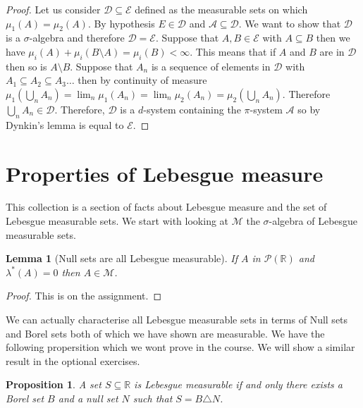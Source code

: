 \documentclass[
]{book}
\newtheorem{lemma}{Lemma}[chapter]
\newtheorem{proposition}{Proposition}[chapter]
\theoremstyle{definition}
\theoremstyle{definition}
\theoremstyle{definition}
\theoremstyle{definition}
\theoremstyle{remark}
\begin{document}
\begin{proof}
Let us consider \(\mathcal{D} \subseteq \mathcal{E}\) defined as the measurable sets on which \(\mu_1(A) = \mu_2(A)\). By hypothesis \(E \in \mathcal{D}\) and \(\mathcal{A} \subseteq \mathcal{D}\). We want to show that \(\mathcal{D}\) is a \(\sigma\)-algebra and therefore \(\mathcal{D} = \mathcal{E}\). Suppose that \(A, B \in \mathcal{E}\) with \(A \subseteq B\) then we have \(\mu_i(A) + \mu_i (B \setminus A) = \mu_i(B) < \infty.\) This means that if \(A\) and \(B\) are in \(\mathcal{D}\) then so is \(A \setminus B\). Suppose that \(A_n\) is a sequence of elements in \(\mathcal{D}\) with \(A_1 \subseteq A_2 \subseteq A_3 \dots\) then by continuity of measure \(\mu_1(\bigcup_n A_n) = \lim_n \mu_1(A_n) = \lim_n \mu_2(A_n) = \mu_2(\bigcup_n A_n)\). Therefore \(\bigcup_n A_n \in \mathcal{D}\). Therefore, \(\mathcal{D}\) is a \(d\)-system containing the \(\pi\)-system \(\mathcal{A}\) so by Dynkin's lemma is equal to \(\mathcal{E}\).
\end{proof}

\hypertarget{properties-of-lebesgue-measure}{%
\section{Properties of Lebesgue measure}\label{properties-of-lebesgue-measure}}

This collection is a section of facts about Lebesgue measure and the set of Lebesgue measurable sets. We start with looking at \(\mathscr{M}\) the \(\sigma\)-algebra of Lebesgue measurable sets.

\begin{lemma}[Null sets are all Lebesgue measurable]
If \(A\) in \(\mathscr{P}(\mathbb{R})\) and \(\lambda^*(A) =0\) then \(A \in \mathscr{M}\).
\end{lemma}

\begin{proof}
This is on the assignment.
\end{proof}

We can actually characterise all Lebesgue measurable sets in terms of Null sets and Borel sets both of which we have shown are measurable. We have the following propersition which we wont prove in the course. We will show a similar result in the optional exercises.

\begin{proposition}
A set \(S \subseteq \mathbb{R}\) is Lebesgue measurable if and only there exists a Borel set \(B\) and a null set \(N\) such that \(S = B \triangle N\).
\end{proposition}
\end{document}
